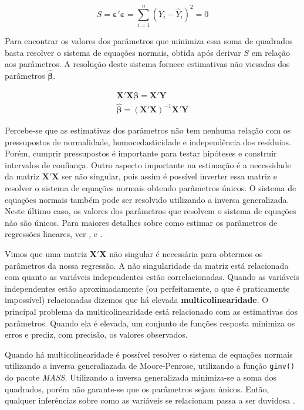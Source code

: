 \documentclass[
]{book}
\begin{document}
\[
S = {\boldsymbol{\varepsilon '\varepsilon }} = \sum\limits_{i = 1}^n {{{\left( {{Y_i} - {{\hat Y}_i}} \right)}^2}} = 0
\]

Para encontrar os valores dos parâmetros que minimiza essa soma de quadrados basta resolver o sistema de equações normais, obtida após derivar \(S\) em relação aos parâmetros. A resolução deste sistema fornece estimativas não viesadas dos parâmetros \({\boldsymbol\hat\beta}\).

\[
\begin{array}{c}{\boldsymbol{X'X\beta = X'Y}}\\{\boldsymbol{\hat\beta}} = {\left( {{\boldsymbol{X'X}}}\right)^{- 1}}{\boldsymbol{X'Y}}\end{array}
\]

Percebe-se que as estimativas dos parâmetros não tem nenhuma relação com os pressupostos  de normalidade, homocedasticidade e independência dos resíduios. Porém, cumprir pressupostos é importante para testar hipóteses e construir intervalos de confiança. Outro aspecto importante na estimação é a necessidade da matriz \(\boldsymbol{X'X}\) ser não singular, pois assim é possível inverter essa matriz e resolver o sistema de equações normais  obtendo parâmetros únicos. O sistema de equações normais também pode ser resolvido utilizando a inversa generalizada. Neste último caso, os valores dos parâmetros que resolvem o sistema de equações não são únicos. Para maiores detalhes sobre como estimar os parâmetros de regressões lineares, ver \citet{Draper1998}, \citet{Kutner2005} e \citet{Rencher2008}.

Vimos que uma matriz \(\boldsymbol{X'X}\) não singular é necessária para obtermos os parâmetros da nossa regressão. A não singularidade da matriz está relacionada com quanto as variáveis independentes estão correlacionadas. Quando as variáveis independentes estão aproximadamente (ou perfeitamente, o que é praticamente impossível) relacionadas dizemos que há elevada \textbf{multicolinearidade}. O principal problema da multicolinearidade está relacionado com as estimativas dos parâmetros. Quando ela é elevada, um conjunto de funções resposta minimiza os erros e prediz, com precisão, os valores observados.

Quando há multicolinearidade é possível resolver o sistema de equações normais  utilizando a inversa generaliazada de Moore-Penrose, utilizando a função \texttt{ginv()}  do pacote \emph{MASS}. Utilizando a inversa generalizada minimiza-se a soma dos quadrados, porém não garante-se que os parâmetros sejam únicos. Então, qualquer inferências sobre como as variáveis se relacionam passa a ser duvidosa \citep{Kutner2005}.
\end{document}
